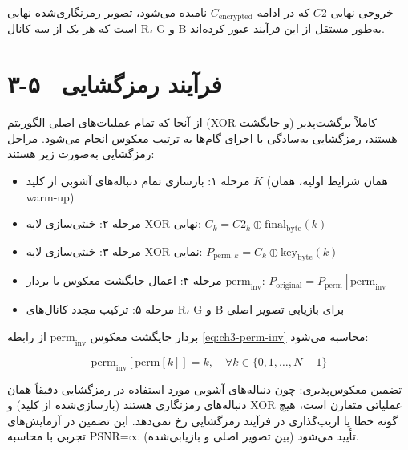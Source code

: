 خروجی نهایی $C2$ که در ادامه $C_{\mathrm{encrypted}}$ نامیده می‌شود، تصویر رمزنگاری‌شده نهایی است که هر یک از سه کانال ‎R‎، ‎G‎ و ‎B‎ به‌طور مستقل از این فرآیند عبور کرده‌اند.

\section{۳-۵  فرآیند رمزگشایی}

از آنجا که تمام عملیات‌های اصلی الگوریتم (‎XOR‎ و جایگشت) کاملاً برگشت‌پذیر هستند، رمزگشایی به‌سادگی با اجرای گام‌ها به ترتیب معکوس انجام می‌شود. مراحل رمزگشایی به‌صورت زیر هستند:

\begin{itemize}
    \item مرحله ۱: بازسازی تمام دنباله‌های آشوبی از کلید $K$ (همان شرایط اولیه، همان ‎warm-up‎)
\end{itemize}

\begin{itemize}
    \item مرحله ۲: خنثی‌سازی لایه ‎XOR‎ نهایی: $C_k = C2_k \oplus \mathrm{final}_{\mathrm{byte}}(k)$
\end{itemize}

\begin{itemize}
    \item مرحله ۳: خنثی‌سازی لایه ‎XOR‎ نمایی: $P_{\mathrm{perm},k} = C_k \oplus \mathrm{key}_{\mathrm{byte}}(k)$
\end{itemize}

\begin{itemize}
    \item مرحله ۴: اعمال جایگشت معکوس با بردار $\mathrm{perm}_{\mathrm{inv}}$: $P_{\mathrm{original}} = P_{\mathrm{perm}}[\mathrm{perm}_{\mathrm{inv}}]$
\end{itemize}

\begin{itemize}
    \item مرحله ۵: ترکیب مجدد کانال‌های ‎R‎، ‎G‎ و ‎B‎ برای بازیابی تصویر اصلی
\end{itemize}

بردار جایگشت معکوس $\mathrm{perm}_{\mathrm{inv}}$ از رابطه \eqref{eq:ch3-perm-inv} محاسبه می‌شود:

\begin{equation}
\mathrm{perm}_{\mathrm{inv}}[\mathrm{perm}[k]] = k, \quad \forall k \in \{0,1,\ldots,N-1\}
\label{eq:ch3-perm-inv}
\end{equation}

تضمین معکوس‌پذیری: چون دنباله‌های آشوبی مورد استفاده در رمزگشایی دقیقاً همان دنباله‌های رمزنگاری هستند (بازسازی‌شده از کلید) و ‎XOR‎ عملیاتی متقارن است، هیچ گونه خطا یا اریب‌گذاری در فرآیند رمزگشایی رخ نمی‌دهد. این تضمین در آزمایش‌های تجربی با محاسبه ‎PSNR‎=$\infty$ (بین تصویر اصلی و بازیابی‌شده) تأیید می‌شود\cite{ref8}.


